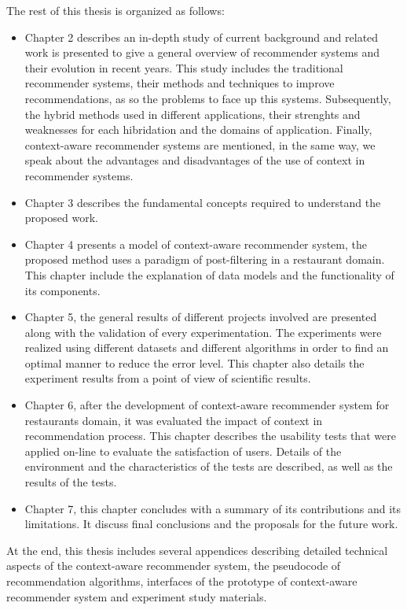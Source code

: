 The rest of this thesis is organized as follows: 
\begin{itemize}  
\item Chapter 2 describes an in-depth study of current background and
related work is presented to give a general overview of recommender
systems and their evolution in recent years. This study includes the
traditional recommender systems, their methods and techniques to
improve recommendations, as so the problems to face up this systems.
Subsequently, the hybrid methods used in different applications, their
strenghts and weaknesses for each hibridation and the domains of
application. Finally, context-aware recommender systems are mentioned,
in the same way, we speak about the advantages and disadvantages of
the use of context in recommender systems.
\item Chapter 3 describes the fundamental concepts required to
understand the proposed work.
\item Chapter 4 presents a model of context-aware recommender system,
the proposed method  uses a paradigm of post-filtering in a restaurant
domain. This chapter include the explanation of data models and the
functionality of its components.
\item Chapter 5, the general results of different projects involved
are presented along with the validation of every experimentation. The
experiments were realized using different datasets and different
algorithms in order to find an optimal manner to reduce the error
level. This chapter also details the experiment results from a point
of view  of scientific results.
\item Chapter 6, after the development of context-aware recommender
system for restaurants domain, it was evaluated the impact of context
in recommendation process. This chapter describes the usability tests
that were applied on-line to evaluate the satisfaction of users.
Details of the environment and the characteristics of the tests are
described, as well as the results of the tests.
\item Chapter 7, this chapter concludes with a
summary of its contributions and  its limitations. It discuss final
conclusions and the proposals for the future work.
\end{itemize}  
At the end, this thesis includes several appendices describing
detailed technical aspects of the context-aware recommender system,
the pseudocode of recommendation algorithms, interfaces of the
prototype of context-aware recommender system and experiment study
materials.



